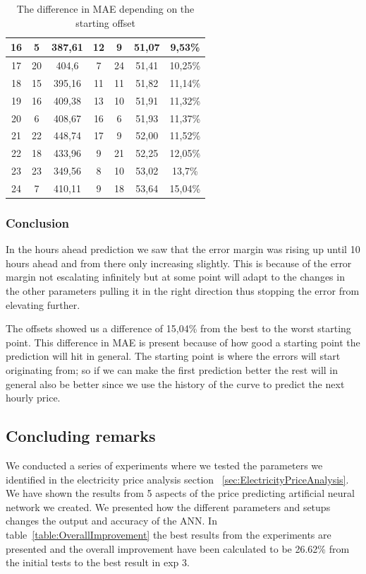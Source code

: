 \begin{table}[H]
{\begin{tabular}{|c|c|c|c|c|c|c|}
	16 & 5  & 387,61 & 12 & 9  & 51,07 & 9,53\% \\ \hline
	17 & 20 & 404,6  & 7  & 24 & 51,41 & 10,25\% \\ \hline
	18 & 15 & 395,16 & 11 & 11 & 51,82 & 11,14\% \\ \hline
	19 & 16 & 409,38 & 13 & 10 & 51,91 & 11,32\% \\ \hline
	20 & 6  & 408,67 & 16 & 6  & 51,93 & 11,37\% \\ \hline
	21 & 22 & 448,74 & 17 & 9  & 52,00 & 11,52\% \\ \hline
	22 & 18 & 433,96 & 9  & 21 & 52,25 & 12,05\% \\ \hline
	23 & 23 & 349,56 & 8  & 10 & 53,02 & 13,7\% \\ \hline
	24 & 7  & 410,11 & 9  & 18 & 53,64 & 15,04\% \\ \hline
	\end{tabular}
}
\caption{The difference in MAE depending on the starting offset} %
\label{table:Offsets} %
\end{table}

\subsubsection{Conclusion}
In the hours ahead prediction we saw that the error margin was rising up until 10 hours ahead and from there only increasing slightly. This is because of the error margin not escalating infinitely but at some point will adapt to the changes in the other parameters pulling it in the right direction thus stopping the error from elevating further.

The offsets showed us a difference of 15,04\% from the best to the worst starting point. This difference in MAE is present because of how good a starting point the prediction will hit in general. The starting point is where the errors will start originating from; so if we can make the first prediction better the rest will in general also be better since we use the history of the curve to predict the next hourly price.

\newpage
\subsection{Concluding remarks}
We conducted a series of experiments where we tested the parameters we identified in the electricity price analysis section ~\ref{sec:ElectricityPriceAnalysis}. We have shown the results from 5 aspects of the price predicting artificial neural network we created. We presented how the different parameters and setups changes the output and accuracy of the ANN. In table~\ref{table:OverallImprovement} the best results from the experiments are presented and the overall improvement have been calculated to be 26.62\% from the initial tests to the best result in exp 3.

